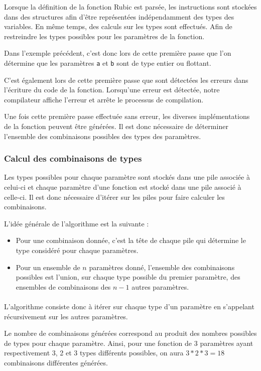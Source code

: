 \documentclass[12pt]{article}
\begin{document}
Lorsque la définition de la fonction Rubic est parsée, les instructions sont
stockées dans des structures afin d'être représentées indépendamment des types
des variables. En même temps, des calculs sur les types sont effectués. Afin
de restreindre les types possibles pour les paramètres de la fonction.

Dans l'exemple précédent, c'est donc lors de cette première passe que l'on
détermine que les paramètres \verb!a! et \verb!b! sont de type entier ou
flottant.

C'est également lors de cette première passe que sont détectées les erreurs dans l'écriture du code de la fonction. Lorsqu'une erreur est détectée, notre compilateur affiche l'erreur et arrête le processus de compilation.

Une fois cette première passe effectuée sans erreur, les diverses implémentations de la fonction peuvent être générées. Il est donc nécessaire de déterminer l'ensemble des combinaisons possibles des types des paramètres.

\subsubsection{Calcul des combinaisons de types}

Les types possibles pour chaque paramètre sont stockés dans une pile associée à celui-ci et chaque paramètre d'une fonction est stocké dans une pile associé à celle-ci. Il est donc nécessaire d'itérer sur les piles pour faire calculer les combinaisons.

L'idée générale de l'algorithme est la suivante :
\begin{itemize}
	\item Pour une combinaison donnée, c'est la tête de chaque pile qui détermine le type considéré pour chaque paramètres.
	\item Pour un ensemble de $n$ paramètres donné, l'ensemble des combinaisons possibles est l'union, sur chaque type possible du premier paramètre, des ensembles de combinaisons des $n-1$ autres paramètres.
\end{itemize}

\paragraph{}L'algorithme consiste donc à itérer sur chaque type d'un paramètre en s'appelant récursivement sur les autres paramètres.

Le nombre de combinaisons générées correspond au produit des nombres possibles de types pour chaque paramètre. Ainsi, pour une fonction de 3 paramètres ayant respectivement 3, 2 et 3 types différents possibles, on aura $3 * 2 * 3 = 18$ combinaisons différentes générées.
\end{document}
